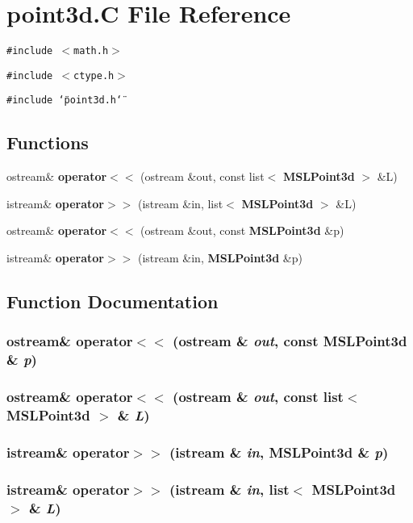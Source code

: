 \section{point3d.C File Reference}
\label{point3d_C}
{\tt \#include $<$math.h$>$}\par
{\tt \#include $<$ctype.h$>$}\par
{\tt \#include \char`\"{}point3d.h\char`\"{}}\par
\subsection*{Functions}
\begin{CompactItemize}
\item 
ostream\& {\bf operator$<$$<$} (ostream \&out, const list$<$ {\bf MSLPoint3d} $>$ \&L)
\item 
istream\& {\bf operator$>$$>$} (istream \&in, list$<$ {\bf MSLPoint3d} $>$ \&L)
\item 
ostream\& {\bf operator$<$$<$} (ostream \&out, const {\bf MSLPoint3d} \&p)
\item 
istream\& {\bf operator$>$$>$} (istream \&in, {\bf MSLPoint3d} \&p)
\end{CompactItemize}


\subsection{Function Documentation}
\subsubsection{\setlength{\rightskip}{0pt plus 5cm}ostream\& operator$<$$<$ (ostream \& {\em out}, const {\bf MSLPoint3d} \& {\em p})}\label{point3d_C_a3}


\subsubsection{\setlength{\rightskip}{0pt plus 5cm}ostream\& operator$<$$<$ (ostream \& {\em out}, const list$<$ {\bf MSLPoint3d} $>$ \& {\em L})}\label{point3d_C_a0}


\subsubsection{\setlength{\rightskip}{0pt plus 5cm}istream\& operator$>$$>$ (istream \& {\em in}, {\bf MSLPoint3d} \& {\em p})}\label{point3d_C_a4}


\subsubsection{\setlength{\rightskip}{0pt plus 5cm}istream\& operator$>$$>$ (istream \& {\em in}, list$<$ {\bf MSLPoint3d} $>$ \& {\em L})}\label{point3d_C_a1}


